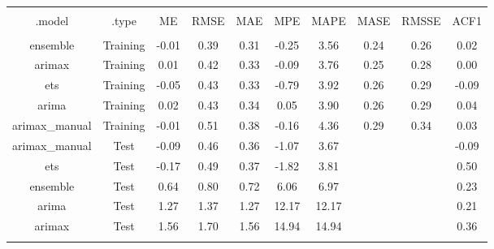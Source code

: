 
\begin{table}[!htbp] \centering 
  \caption{} 
  \label{} 
\begin{tabular}{@{\extracolsep{5pt}} cccccccccc} 
\\[-1.8ex]\hline 
\hline \\[-1.8ex] 
.model & .type & ME & RMSE & MAE & MPE & MAPE & MASE & RMSSE & ACF1 \\ 
\hline \\[-1.8ex] 
ensemble & Training & -0.01 & 0.39 & 0.31 & -0.25 &  3.56 & 0.24 & 0.26 &  0.02 \\ 
arimax & Training &  0.01 & 0.42 & 0.33 & -0.09 &  3.76 & 0.25 & 0.28 &  0.00 \\ 
ets & Training & -0.05 & 0.43 & 0.33 & -0.79 &  3.92 & 0.26 & 0.29 & -0.09 \\ 
arima & Training &  0.02 & 0.43 & 0.34 &  0.05 &  3.90 & 0.26 & 0.29 &  0.04 \\ 
arimax\_manual & Training & -0.01 & 0.51 & 0.38 & -0.16 &  4.36 & 0.29 & 0.34 &  0.03 \\ 
arimax\_manual & Test & -0.09 & 0.46 & 0.36 & -1.07 &  3.67 &  &  & -0.09 \\ 
ets & Test & -0.17 & 0.49 & 0.37 & -1.82 &  3.81 &  &  &  0.50 \\ 
ensemble & Test &  0.64 & 0.80 & 0.72 &  6.06 &  6.97 &  &  &  0.23 \\ 
arima & Test &  1.27 & 1.37 & 1.27 & 12.17 & 12.17 &  &  &  0.21 \\ 
arimax & Test &  1.56 & 1.70 & 1.56 & 14.94 & 14.94 &  &  &  0.36 \\ 
\hline \\[-1.8ex] 
\end{tabular} 
\end{table} 
